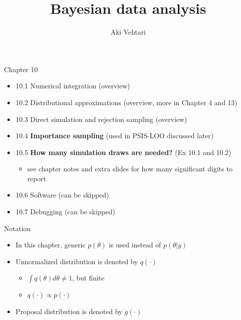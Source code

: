 \documentclass[finnish,english,t]{beamer}
\title[]{Bayesian data analysis}
\subtitle{}
\author{Aki Vehtari}
\institute[Aalto]{}
\begin{document}
\begin{frame}{Chapter 10}

  \begin{itemize}
\item 10.1 Numerical integration (overview)
\item 10.2 Distributional approximations (overview, more in Chapter 4 and 13)
\item 10.3 Direct simulation and rejection sampling (overview)
\item 10.4 \textbf{Importance sampling} (used in PSIS-LOO discussed later)
\item 10.5 \textbf{How many simulation draws are needed?} (Ex 10.1 and 10.2)
  \begin{itemize}
  \item see chapter notes and extra slides for how many significant
    digits to report
  \end{itemize}
\item 10.6 Software (can be skipped)
\item 10.7 Debugging (can be skipped)
   \end{itemize}
\end{frame}

\begin{frame}{Notation}

  \begin{itemize}
  \item In this chapter, generic $p(\theta)$ is used instead of
    $p(\theta|y)$
  \item Unnormalized distribution is denoted by $q(\cdot)$
    \begin{itemize}
    \item $\int q(\theta) d\theta \neq 1$, but finite
    \item $q(\cdot) \propto p(\cdot)$
    \end{itemize}
  \item Proposal distribution is denoted by $g(\cdot)$
  \end{itemize}

\end{frame}
\end{document}
